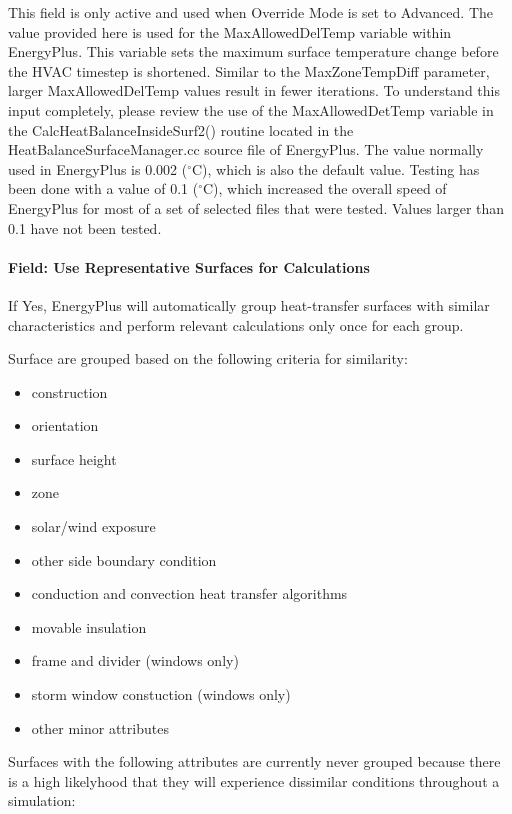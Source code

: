 This field is only active and used when Override Mode is set to Advanced. The value provided here is used for the MaxAllowedDelTemp variable within EnergyPlus. This variable sets the maximum surface temperature change before the HVAC timestep is shortened. Similar to the MaxZoneTempDiff parameter, larger MaxAllowedDelTemp values result in fewer iterations. To understand this input completely, please review the use of the MaxAllowedDetTemp variable in the CalcHeatBalanceInsideSurf2() routine located in the HeatBalanceSurfaceManager.cc source file of EnergyPlus. The value normally used in EnergyPlus is 0.002 ($^\circ$C), which is also the default value. Testing has been done with a value of 0.1 ($^\circ$C), which increased the overall speed of EnergyPlus for most of a set of selected files that were tested. Values larger than 0.1 have not been tested.

\paragraph{Field: Use Representative Surfaces for Calculations}\label{use-representative-surfaces-for-calculations}

If Yes, EnergyPlus will automatically group heat-transfer surfaces with similar characteristics and perform relevant calculations only once for each group.

Surface are grouped based on the following criteria for similarity:

\begin{itemize}
    \item construction
    \item orientation
    \item surface height
    \item zone
    \item solar/wind exposure
    \item other side boundary condition
    \item conduction and convection heat transfer algorithms
    \item movable insulation
    \item frame and divider (windows only)
    \item storm window constuction (windows only)
    \item other minor attributes
\end{itemize}

Surfaces with the following attributes are currently never grouped because there is a high likelyhood that they will experience dissimilar conditions throughout a simulation:


